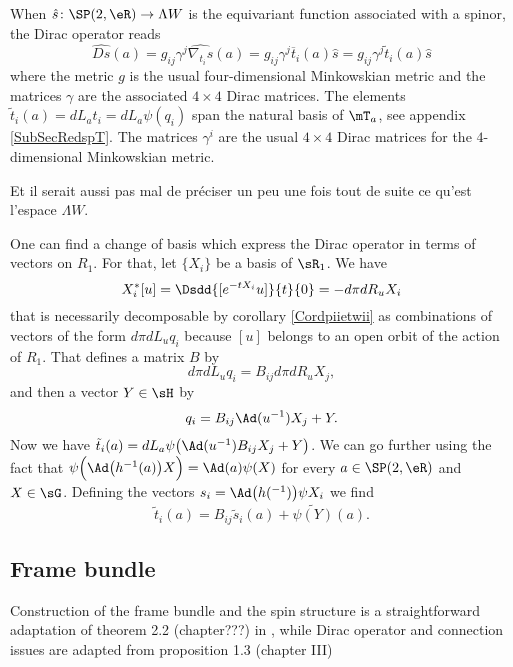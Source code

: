 When $\hat{s}\colon \SP(2,\eR) \to \Lambda W$ is the equivariant function associated with a spinor, the Dirac operator reads
\begin{equation}        \label{EqDiracAdsquatre}
\widehat{Ds}(a)=g_{ij}\gamma^j\widehat{\nabla_{t_i}s}(a)
        =g_{ij}\gamma^j\overline{ t }_i(a)\hat{s}
        =g_{ij}\gamma^j\tilde t_i(a)\hat{s}
\end{equation}
where the metric $g$ is the usual four-dimensional Minkowskian metric and the matrices $\gamma$ are the associated $4\times 4$ Dirac matrices. The elements $\tilde t_i(a)=dL_at_i=dL_a\psi(q_i)$ span the natural basis of $\mT_a$, see appendix \ref{SubSecRedspT}. The matrices $\gamma^i$ are the usual $4\times 4$ Dirac matrices for the $4$-dimensional Minkowskian metric.

\begin{probleme}
Et il serait aussi pas mal de préciser un peu une fois tout de suite ce qu'est l'espace $\Lambda W$.
\end{probleme}

One can find a change of basis which express the Dirac operator in terms of vectors on $R_1$. For that, let $\{ X_i \}$ be a basis of $\sR_1$. We have 
\[ 
  X^*_i[u]=\Dsdd{ [ e^{-tX_i}u] }{t}{0}=-d\pi dR_uX_i
\]
that is necessarily decomposable by corollary \ref{Cordpiietwii} as combinations of vectors of the form $d\pi dL_uq_i$ because $[u]$ belongs to an open orbit of the action of $R_1$. That defines a matrix $B$ by
\[ 
  d\pi dL_uq_i=B_{ij}d\pi dR_uX_j,
\]
and then a vector $Y\in \sH$ by
\begin{equation}
q_i=B_{ij}\Ad(u^{-1})X_j+Y.
\end{equation}
Now we have $\tilde t_i(a)=dL_a\psi\big( \Ad(u^{-1})B_{ij}X_j+Y \big)$. We can go further using the fact that $\psi\Big( \Ad\big( h^{-1}(a) \big)X \Big)=\Ad(a)\psi(X)$ for every $a\in\SP(2,\eR)$ and $X\in\sG$. Defining the vectors $s_i=\Ad\big( h(^{-1}) \big)\psi X_i$ we find
\begin{equation}
\tilde t_i(a)=B_{ij}\tilde s_i(a)+\widetilde{\psi(Y)}(a).
\end{equation}

\subsection{Frame bundle}

Construction of the frame bundle and the spin structure is a straightforward adaptation of theorem 2.2 (chapter???) in \cite{AnnikFranc}, while Dirac operator and connection issues are adapted from proposition 1.3 (chapter III)

